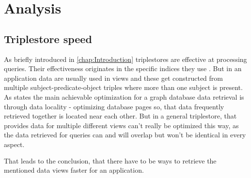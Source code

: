 \chapter{Analysis}
\label{chap:Analysis}

\section{Triplestore speed}
As briefly introduced in \autoref{chap:Introduction} triplestores are effective at processing queries. Their effectiveness originates in the specific indices they use \cite{onlineAllgeroGraphTripleIndices}. But in an application data are usually used in views and these get constructed from multiple subject-predicate-object triples where more than one subject is present.
As \cite{onlineDbisQueryOptimizationInRdf} states the main achievable optimization for a graph database data retrieval is through data locality - optimizing database pages so, that data frequently retrieved together is located near each other. But in a general triplestore, that provides data for multiple different views can't really be optimized this way, as the data retrieved for queries can and will overlap but won't be identical in every aspect.

That leads to the conclusion, that there have to be ways to retrieve the mentioned data views faster for an application.

